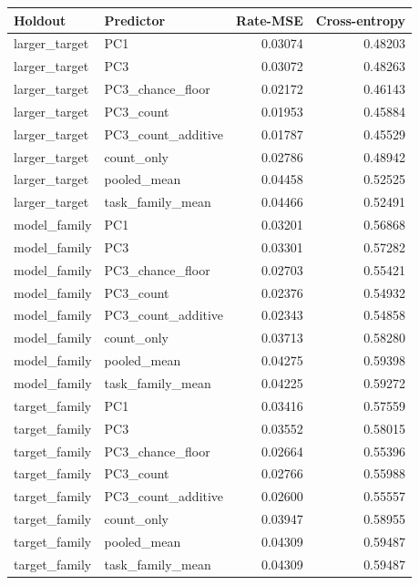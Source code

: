 \begin{tabular}{llrr}
\toprule
Holdout & Predictor & Rate-MSE & Cross-entropy\\
\midrule
larger\_target & PC1 & 0.03074 & 0.48203\\
larger\_target & PC3 & 0.03072 & 0.48263\\
larger\_target & PC3\_chance\_floor & 0.02172 & 0.46143\\
larger\_target & PC3\_count & 0.01953 & 0.45884\\
larger\_target & PC3\_count\_additive & 0.01787 & 0.45529\\
larger\_target & count\_only & 0.02786 & 0.48942\\
larger\_target & pooled\_mean & 0.04458 & 0.52525\\
larger\_target & task\_family\_mean & 0.04466 & 0.52491\\
model\_family & PC1 & 0.03201 & 0.56868\\
model\_family & PC3 & 0.03301 & 0.57282\\
model\_family & PC3\_chance\_floor & 0.02703 & 0.55421\\
model\_family & PC3\_count & 0.02376 & 0.54932\\
model\_family & PC3\_count\_additive & 0.02343 & 0.54858\\
model\_family & count\_only & 0.03713 & 0.58280\\
model\_family & pooled\_mean & 0.04275 & 0.59398\\
model\_family & task\_family\_mean & 0.04225 & 0.59272\\
target\_family & PC1 & 0.03416 & 0.57559\\
target\_family & PC3 & 0.03552 & 0.58015\\
target\_family & PC3\_chance\_floor & 0.02664 & 0.55396\\
target\_family & PC3\_count & 0.02766 & 0.55988\\
target\_family & PC3\_count\_additive & 0.02600 & 0.55557\\
target\_family & count\_only & 0.03947 & 0.58955\\
target\_family & pooled\_mean & 0.04309 & 0.59487\\
target\_family & task\_family\_mean & 0.04309 & 0.59487\\
\bottomrule
\end{tabular}
